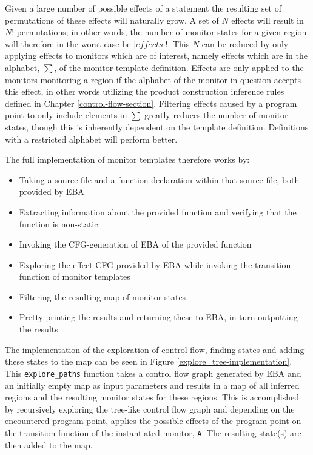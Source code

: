 \newpar Given a large number of possible effects of a statement the resulting set of permutations of these effects will naturally grow. A set of $N$ effects will result in $N!$ permutations; in other words, the number of monitor states for a given region will therefore in the worst case be $|\mathit{effects}|!$. This $N$ can be reduced by only applying effects to monitors which are of interest, namely effects which are in the alphabet, $\sum$, of the monitor template definition. Effects are only applied to the monitors monitoring a region if the alphabet of the monitor in question accepts this effect, in other words utilizing the product construction inference rules defined in Chapter \ref{control-flow-section}.  Filtering effects caused by a program point to only include elements in $\sum$ greatly reduces the number of monitor states, though this is inherently dependent on the template definition. Definitions with a restricted alphabet will perform better. 

\newpar The full implementation of monitor templates therefore works by:

\begin{itemize}
    \item Taking a source file and a function declaration within that source file, both provided by EBA
    \item Extracting information about the provided function and verifying that the function is non-static
    \item Invoking the CFG-generation of EBA of the provided function
    \item Exploring the effect CFG provided by EBA while invoking the transition function of monitor templates
    \item Filtering the resulting map of monitor states
    \item Pretty-printing the results and returning these to EBA, in turn outputting the results 
\end{itemize}

\newpar The implementation of the exploration of control flow, finding states and adding these states to the map can be seen in Figure \ref{explore_tree-implementation}. This \texttt{explore\_paths} function takes a control flow graph generated by EBA and an initially empty map as input parameters and results in a map of all inferred regions and the resulting monitor states for these regions. This is accomplished by recursively exploring the tree-like control flow graph and depending on the encountered program point, applies the possible effects of the program point on the transition function of the instantiated monitor, \texttt{A}. The resulting state(s) are then added to the map. 

